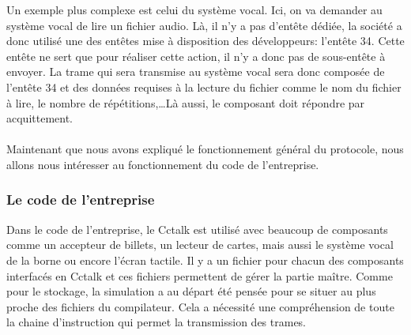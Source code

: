 \documentclass[a4paper]{article}
\begin{document}
Un exemple plus complexe est celui du système vocal. Ici, on va demander au
système vocal de lire un fichier audio. Là, il n'y a pas d'entête dédiée, la
société a donc utilisé une des entêtes mise à disposition des développeurs:
l'entête 34. Cette entête ne sert que pour réaliser cette action, il n'y a donc
pas de sous-entête à envoyer. La trame qui sera transmise au système vocal sera
donc composée de l'entête 34 et des données requises à la lecture du fichier
comme le nom du fichier à lire, le nombre de répétitions,\dots Là aussi, le
composant doit répondre par acquittement.
\\~\\

Maintenant que nous avons expliqué le fonctionnement général du protocole, nous
allons nous intéresser au fonctionnement du code de l'entreprise.

\subsubsection{Le code de l'entreprise}

Dans le code de l'entreprise, le Cctalk est utilisé avec beaucoup de composants
comme un accepteur de billets, un lecteur de cartes, mais aussi le système vocal
de la borne ou encore l'écran tactile. Il y a un fichier pour chacun des
composants interfacés en Cctalk et ces fichiers permettent de gérer la partie
maître. Comme pour le stockage, la simulation a au départ été pensée pour se
situer au plus proche des fichiers du compilateur. Cela a nécessité une
compréhension de toute la chaine d'instruction qui permet la transmission des
trames.
\end{document}
